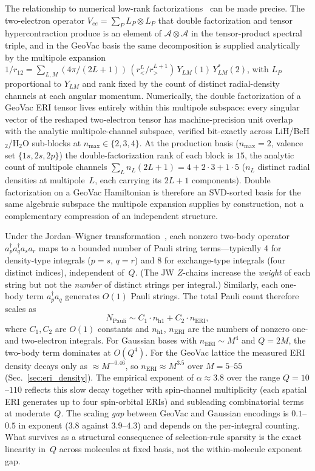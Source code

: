 \documentclass[aps,pra,twocolumn,superscriptaddress,longbibliography]{revtex4-2}
\begin{document}
The relationship to numerical low-rank factorizations~\cite{motta2021,
lee2021} can be made precise.  The two-electron operator
$V_{ee} = \sum_P L_P \otimes L_P$ that double factorization and tensor
hypercontraction produce is an element of $\mathcal{A} \otimes \mathcal{A}$
in the tensor-product spectral triple, and in the GeoVac basis the same
decomposition is supplied analytically by the multipole expansion
$1/r_{12} = \sum_{L,M} (4\pi/(2L{+}1))\,(r_<^L/r_>^{L{+}1})\,Y_{LM}(1)\,
Y_{LM}^{*}(2)$, with $L_P$ proportional to $Y_{LM}$ and rank fixed by
the count of distinct radial-density channels at each angular momentum.
Numerically, the double factorization of a GeoVac ERI tensor lives
entirely within this multipole subspace: every singular vector of the
reshaped two-electron tensor has machine-precision unit overlap with the
analytic multipole-channel subspace, verified bit-exactly across
LiH/BeH$_2$/H$_2$O sub-blocks at $n_{\max} \in \{2, 3, 4\}$.  At the
production basis ($n_{\max} = 2$, valence set $\{1s, 2s, 2p\}$) the
double-factorization rank of each block is $15$, the analytic count of
multipole channels $\sum_L n_L(2L{+}1) = 4 + 2\cdot 3 + 1\cdot 5$
($n_L$ distinct radial densities at multipole~$L$, each carrying its
$2L{+}1$ components).  Double factorization on a GeoVac Hamiltonian
is therefore an SVD-sorted basis for the same algebraic subspace the
multipole expansion supplies by construction, not a complementary
compression of an independent structure.

Under the Jordan--Wigner transformation~\cite{jordan1928,bravyi2002},
each nonzero two-body operator
$a^\dagger_p a^\dagger_q a_s a_r$ maps to a bounded number of Pauli
string terms---typically 4 for density-type integrals ($p{=}s$, $q{=}r$)
and 8 for exchange-type integrals (four distinct indices), independent
of~$Q$.  (The JW $Z$-chains increase the \emph{weight} of each string
but not the \emph{number} of distinct strings per integral.)  Similarly,
each one-body term $a^\dagger_p a_q$ generates $O(1)$ Pauli strings.
The total Pauli count therefore scales as
\begin{equation}
  N_{\mathrm{Pauli}} \sim C_1 \cdot n_{\mathrm{h1}}
  + C_2 \cdot n_{\mathrm{ERI}},
  \label{eq:pauli_scaling}
\end{equation}
where $C_1, C_2$ are $O(1)$ constants and $n_{\mathrm{h1}}$,
$n_{\mathrm{ERI}}$ are the numbers of nonzero one- and two-electron
integrals.  For Gaussian bases with
$n_{\mathrm{ERI}} \sim M^4$ and $Q = 2M$, the two-body term dominates at
$O(Q^{4})$.  For the GeoVac lattice the measured ERI density decays
only as $\approx M^{-0.46}$, so $n_{\mathrm{ERI}} \approx M^{3.5}$ over
$M = 5$--$55$ (Sec.~\ref{sec:eri_density}).  The empirical exponent
of $\alpha \approx 3.8$ over the range $Q = 10$--$110$ reflects this
slow decay together with
spin-channel multiplicity (each spatial ERI generates up to four
spin-orbital ERIs) and subleading combinatorial terms at moderate~$Q$.
The scaling \emph{gap} between GeoVac and Gaussian encodings is
$0.1$--$0.5$ in exponent ($3.8$ against $3.9$--$4.3$) and depends on
the per-integral counting.  What survives as a
structural consequence of selection-rule sparsity is the exact linearity
in~$Q$ across molecules at fixed basis, not the within-molecule exponent
gap.
\end{document}
